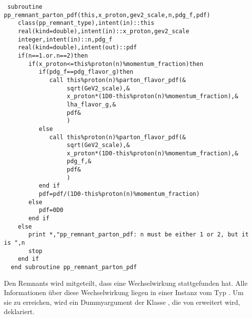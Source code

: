 \begin{Verbatim}
 subroutine pp_remnant_parton_pdf(this,x_proton,gev2_scale,n,pdg_f,pdf)
    class(pp_remnant_type),intent(in)::this
    real(kind=double),intent(in)::x_proton,gev2_scale
    integer,intent(in)::n,pdg_f
    real(kind=double),intent(out)::pdf
    if(n==1.or.n==2)then
       if(x_proton<=this%proton(n)%momentum_fraction)then
          if(pdg_f==pdg_flavor_g)then
             call this%proton(n)%parton_flavor_pdf(&
                  sqrt(GeV2_scale),&
                  x_proton*(1D0-this%proton(n)%momentum_fraction),&
                  lha_flavor_g,&
                  pdf&
                  )
          else
             call this%proton(n)%parton_flavor_pdf(&
                  sqrt(GeV2_scale),&
                  x_proton*(1D0-this%proton(n)%momentum_fraction),&
                  pdg_f,&
                  pdf&
                  )
          end if
          pdf=pdf/(1D0-this%proton(n)%momentum_fraction)
       else
          pdf=0D0
       end if
    else
       print *,"pp_remnant_parton_pdf: n must be either 1 or 2, but it is ",n
       stop
    end if
  end subroutine pp_remnant_parton_pdf
\end{Verbatim}
Den Remnants wird mitgeteilt, dass eine Wechselwirkung stattgefunden hat. Alle Informationen über diese Wechselwirkung liegen in einer Instanz vom Typ . Um sie zu erreichen, wird ein Dummyargument der Klasse , die von  erweitert wird, deklariert. 

